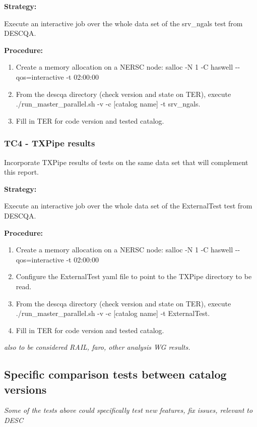 \documentclass[12pt, a4paper]{article}
\begin{document}
\textbf{Strategy:} 

Execute an interactive job over the whole data set of the srv\_ngals test from DESCQA. 

\textbf{Procedure:} 

\begin{enumerate}
	\item Create a memory allocation on a NERSC node: salloc -N 1 -C haswell -{}-qos=interactive -t 02:00:00
	\item From the descqa directory (check version and state on TER), execute ./run\_master\_parallel.sh -v -c [catalog name] -t srv\_ngals. 
	\item Fill in TER for code version and tested catalog.
\end{enumerate}

\subsubsection{TC4 - TXPipe results}
Incorporate TXPipe results of tests on the same data set that will complement this report.

\textbf{Strategy:} 

Execute an interactive job over the whole data set of the ExternalTest test from DESCQA. 

\textbf{Procedure:} 

\begin{enumerate}
	\item Create a memory allocation on a NERSC node: salloc -N 1 -C haswell -{}-qos=interactive -t 02:00:00
	\item Configure the ExternalTest yaml file to point to the TXPipe directory to be read.
	\item From the descqa directory (check version and state on TER), execute ./run\_master\_parallel.sh -v -c [catalog name] -t ExternalTest. 
	\item Fill in TER for code version and tested catalog.
\end{enumerate}

\textit{also to be considered RAIL, faro, other analysis WG results.}

\subsection{Specific comparison tests between catalog versions}

\textit{Some of the tests above could specifically test new features, fix issues, relevant to DESC}
\end{document}
